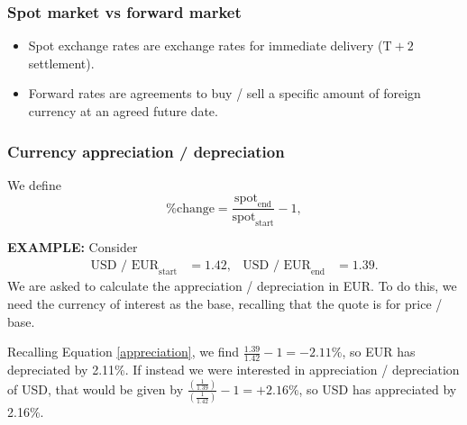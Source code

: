 \documentclass[../notes_compiled.tex]{subfiles}
\begin{document}
\subsubsection{Spot market vs forward market}
\begin{itemize}
\item Spot exchange rates are exchange rates for immediate delivery ($\text{T}+2$ settlement).
\item Forward rates are agreements to buy / sell a specific amount of foreign currency at an agreed future date.
\end{itemize}

\subsubsection{Currency appreciation / depreciation}
\begin{itemize}
\item We define
\begin{equation}
\text{\% change} = \frac{\text{spot}_{\text{end}}}{\text{spot}_{\text{start}}}-1, \label{appreciation}
\end{equation}
{\color{RedViolet}
\item[] \textbf{EXAMPLE:} Consider
\begin{align*}
\text{USD / EUR}_{\text{start}} &= 1.42, &
\text{USD / EUR}_{\text{end}} &=  1.39.
\end{align*}
We are asked to calculate the appreciation / depreciation in EUR. To do this, we need the currency of interest as the base, recalling that the quote is for price / base.
}
{\color{RoyalBlue}
\item[] Recalling Equation \ref{appreciation}, we find $\frac{1.39}{1.42}-1=-2.11\%$, so EUR has depreciated by 2.11\%. If instead we were interested in appreciation / depreciation of USD, that would be given by $\frac{\left(\frac{1}{1.39}\right)}{\left(\frac{1}{1.42}\right)}-1 = +2.16\%$, so USD has appreciated by 2.16\%.
}
\end{itemize}
\end{document}
